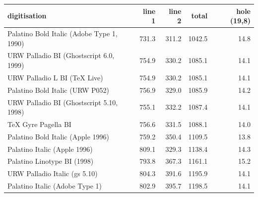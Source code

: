 \begin{tabular}{lrrrr}\toprule
 digitisation & line 1 & line 2 & total & hole (19,8) \\ \midrule
Palatino Bold Italic (Adobe Type 1, 1990) & 731.3 & 311.2 & 1042.5 & 14.8 \\
URW Palladio BI (Ghostscript 6.0, 1999) & 754.9 & 330.2 & 1085.1 & 14.1 \\
URW Palladio L BI (TeX Live) & 754.9 & 330.2 & 1085.1 & 14.1 \\
Palatino Bold Italic (URW P052) & 756.9 & 329.0 & 1085.9 & 14.2 \\
URW Palladio BI (Ghostscript 5.10, 1998) & 755.1 & 332.2 & 1087.4 & 14.1 \\
TeX Gyre Pagella BI & 756.6 & 331.5 & 1088.1 & 14.0 \\
Palatino Bold Italic (Apple 1996) & 759.2 & 350.4 & 1109.5 & 13.8 \\
Palatino Italic (Apple 1996) & 809.1 & 329.3 & 1138.4 & 14.3 \\
Palatino Linotype BI (1998) & 793.8 & 367.3 & 1161.1 & 15.2 \\
URW Palladio Italic (gs 5.10) & 804.3 & 391.6 & 1195.9 & 14.1 \\
Palatino Italic (Adobe Type 1) & 802.9 & 395.7 & 1198.5 & 14.1 \\
\bottomrule\end{tabular}

